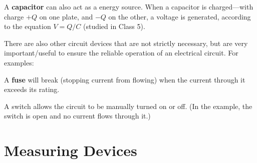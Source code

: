 A \textbf{capacitor} can also act as a energy source. When a capacitor is
charged---with charge $+Q$ on one plate, and $-Q$ on the other, a voltage is
generated, according to the equation $V=Q/C$ (studied in Class 5).

There are also other circuit devices that are not strictly necessary, but are
very important/useful to ensure the reliable operation of an electrical
circuit. For examples:

\begin{figure}[ht]
  \centering
\end{figure}
A \textbf{fuse} will break (stopping current from flowing) when the current
through it exceeds its rating.

\begin{figure}[ht]
  \centering
\end{figure}
A switch allows the circuit to be manually turned on or off. (In the example,
the switch is open and no current flows through it.)
%  
%
%
%
\section{Measuring Devices}

